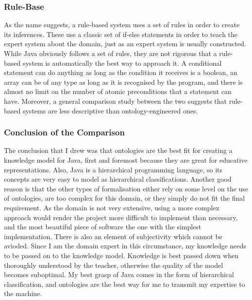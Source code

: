 \documentclass[titlepage]{article}
\begin{document}
\subsubsection{Rule-Base}
As the name suggests, a rule-based system uses a set of rules in order to create its inferences. These use a classic set of if-else statements in order to teach the expert system about the domain, just as an expert system is usually constructed.
\newline
While Java obviously follows a set of rules, they are not rigorous that a rule-based system is automatically the best way to approach it. A conditional statement can do anything as long as the condition it receives is a boolean, an array can be of any type as long as it is recognised by the program, and there is almost no limit on the number of atomic preconditions that a statement can have.
\newline
Moreover, a general comparison study between the two suggests that rule-based systems are less descriptive than ontology-engineered ones\cite{rulesvsonto}.

\subsubsection{Conclusion of the Comparison}
The conclusion that I drew was that ontologies are the best fit for creating a knowledge model for Java, first and foremost because they are great for educative representations. Also, Java is a hierarchical programming language, so its concepts are very easy to model as hierarchical classifications.
\newline
Another good reason is that the other types of formalisation either rely on some level on the use of ontologies, are too complex for this domain, or they simply do not fit the final requirement. As the domain is not very extensive, using a more complex approach would render the project more difficult to implement than necessary, and the most beautiful piece of software the one with the simplest implementation.
\newline
There is also an element of subjectivity which cannot be avioded. Since I am the domain expert in this circumstance, my knowledge needs to be passed on to the knowledge model. Knowledge is best passed down when thoroughly understood by the teacher, otherwise the quality of the model becomes suboptimal. My best grasp of Java comes in the form of hierarchical classification, and ontologies are the best way for me to transmit my expertise to the machine.
\end{document}

